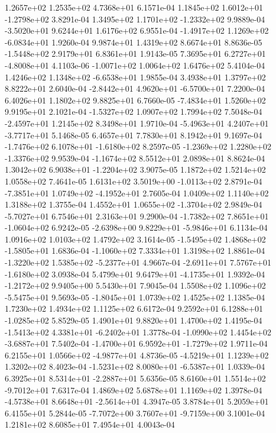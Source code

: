 1.2657e+02 1.2535e+02 4.7368e+01  6.1571e-04
 1.1845e+02  1.6012e+01 -1.2798e+02  3.8291e-04
 1.3495e+02  1.1701e+02 -1.2332e+02  9.9889e-04
-3.5020e+01  9.6244e+01  1.6176e+02  6.9551e-04
-1.4917e+02  1.1269e+02 -6.0834e+01  1.9260e-04
9.9874e+01 1.4319e+02 8.6674e+01  8.8636e-05
-1.5448e+02  2.9179e+01  6.8361e+01  1.9143e-05
 7.3695e+01  6.2727e+01 -4.8008e+01  4.1103e-06
-1.0071e+02  1.0064e+02  1.6476e+02  5.4104e-04
 1.4246e+02  1.1348e+02 -6.6538e+01  1.9855e-04
3.4938e+01 1.3797e+02 8.8222e+01  2.6040e-04
-2.8442e+01  4.9620e+01 -6.5700e+01  7.2200e-04
6.4026e+01 1.1802e+02 9.8825e+01  6.7660e-05
-7.4834e+01  1.5260e+02  9.9195e+01  2.1021e-04
-1.5327e+02  1.0907e+02  1.7994e+02  7.5048e-04
-2.4597e+01  1.2145e+02  8.3498e+01  1.9710e-04
-5.4963e+01  4.2407e+01 -3.7717e+01  5.1468e-05
6.4657e+01 7.7830e+01 8.1942e+01  9.1697e-04
-1.7476e+02  6.1078e+01 -1.6180e+02  8.2597e-05
-1.2369e+02  1.2280e+02 -1.3376e+02  9.9539e-04
-1.1674e+02  8.5512e+01  2.0898e+01  8.8624e-04
 1.3042e+02  6.9038e+01 -1.2204e+02  3.9075e-05
1.1872e+02 1.5214e+02 1.0558e+02  7.4641e-05
 1.6131e+02  3.5019e+00 -1.0113e+02  2.8791e-04
-7.3851e+01  1.0749e+02 -4.1952e+01  2.7605e-04
1.0409e+02 1.1140e+02 1.3188e+02  1.3755e-04
 1.4552e+01  1.0655e+02 -1.3704e+02  2.9849e-04
-5.7027e+01  6.7546e+01  2.3163e+01  9.2900e-04
-1.7382e+02  7.8651e+01 -1.0604e+02  6.9242e-05
-2.6398e+00  9.8229e+01 -5.9846e+01  6.1134e-04
1.0916e+02 1.0103e+02 1.4792e+02  3.1614e-05
-1.5495e+02  1.4868e+02 -1.5805e+01  1.6836e-04
-1.1060e+02  7.3334e+01  1.3198e+02  1.8861e-04
-1.3220e+02  1.5385e+02 -5.2377e+01  4.9667e-04
-2.6911e+01  7.5767e+01 -1.6180e+02  3.0938e-04
 5.4799e+01  9.6479e+01 -4.1735e+01  1.9392e-04
-1.2172e+02  9.9405e+00  5.5430e+01  7.9045e-04
 1.5508e+02  1.1096e+02 -5.5475e+01  9.5693e-05
-1.8045e+01  1.0739e+02  1.4525e+02  1.1385e-04
1.7230e+02 1.4934e+02 1.1125e+02  6.6172e-04
 9.2592e+01  6.1288e+01 -1.0285e+02  5.8529e-05
1.4901e+01 9.8820e+01 1.4700e+02  1.4195e-04
-1.5413e+02  4.3381e+01 -6.2402e+01  1.3778e-04
-1.0990e+02  1.4454e+02 -3.6887e+01  7.5402e-04
-1.4700e+01  6.9592e+01 -1.7279e+02  1.9711e-04
 6.2155e+01  1.0566e+02 -4.9877e+01  4.8736e-05
-4.5219e+01  1.1239e+02  1.3202e+02  8.4023e-04
-1.5231e+02  8.0080e+01 -6.5387e+01  1.0339e-04
 6.3925e+01  8.5314e+01 -2.2887e+01  5.6356e-05
 8.6160e+01  1.5514e+02 -9.7012e+01  7.6317e-04
1.4869e+02 5.6878e+01 1.1169e+02  1.3978e-04
-4.5738e+01  8.6648e+01 -2.5614e+01  4.3947e-05
3.8784e+01 5.2059e+01 6.4155e+01  5.2844e-05
-7.7072e+00  3.7607e+01 -9.7159e+00  3.1001e-04
1.2181e+02 8.6085e+01 7.4954e+01  4.0043e-04

